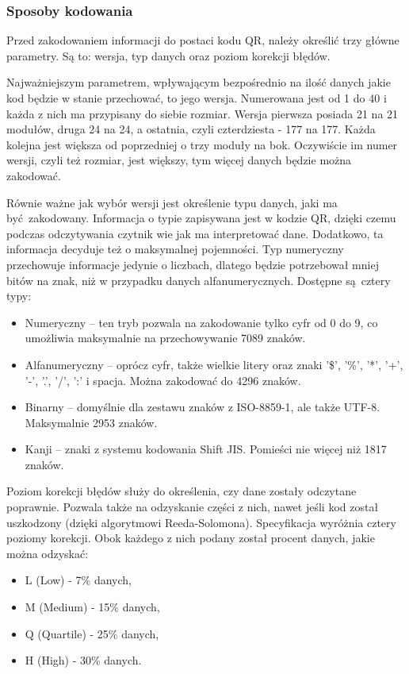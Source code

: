 \subsubsection*{Sposoby kodowania}
Przed zakodowaniem informacji do postaci kodu QR, należy określić trzy główne parametry. Są to: wersja, typ danych oraz poziom korekcji błędów.

Najważniejszym parametrem, wpływającym bezpośrednio na ilość danych jakie kod będzie w stanie przechować, to jego wersja. Numerowana jest od 1 do 40 i każda z nich ma przypisany do siebie rozmiar. Wersja pierwsza posiada 21 na 21 modułów, druga 24 na 24, a ostatnia, czyli czterdziesta - 177 na 177. Każda kolejna jest większa od poprzedniej o trzy moduły na bok. Oczywiście im numer wersji, czyli też rozmiar, jest większy, tym więcej danych będzie można zakodować. 

Równie ważne jak wybór wersji jest określenie typu danych, jaki ma być zakodowany. Informacja o typie zapisywana jest w kodzie QR, dzięki czemu podczas odczytywania czytnik wie jak ma interpretować dane. Dodatkowo, ta informacja decyduje też o maksymalnej pojemności. Typ numeryczny przechowuje informacje jedynie o liczbach, dlatego będzie potrzebował mniej bitów na znak, niż w przypadku danych alfanumerycznych. Dostępne są cztery typy:
\begin{itemize}
	\item Numeryczny -- ten tryb pozwala na zakodowanie tylko cyfr od 0 do 9, co umożliwia maksymalnie na przechowywanie 7089 znaków.
	\item Alfanumeryczny -- oprócz cyfr, także wielkie litery oraz znaki '\$', '\%', '*', '+', '-', '.', '/', ':' i spacja. Można zakodować do 4296 znaków. 
	\item Binarny -- domyślnie dla zestawu znaków z ISO-8859-1, ale także UTF-8. Maksymalnie 2953 znaków.
	\item Kanji -- znaki z systemu kodowania Shift JIS. Pomieści nie więcej niż 1817 znaków.
\end{itemize}

Poziom korekcji błędów służy do określenia, czy dane zostały odczytane poprawnie. Pozwala także na odzyskanie części z nich, nawet jeśli kod został uszkodzony (dzięki algorytmowi Reeda-Solomona). Specyfikacja wyróżnia cztery poziomy korekcji. Obok każdego z nich podany został procent danych, jakie można odzyskać:
\begin{itemize}
	\item L (Low) - 7\% danych,
	\item M (Medium) - 15\% danych,
	\item Q (Quartile) - 25\% danych,
	\item H (High) - 30\% danych.
\end{itemize}


